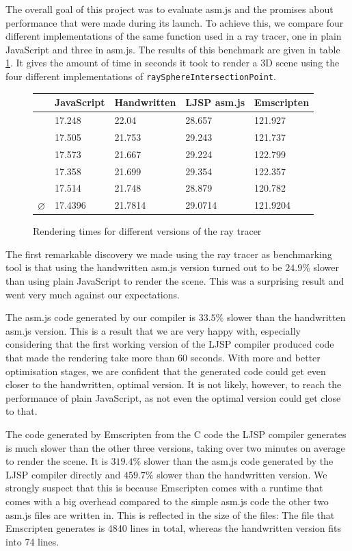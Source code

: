 \documentclass[11pt]{report}
\begin{document}
The overall goal of this project was to evaluate asm.js and the promises about performance that were made during its launch. To achieve this, we compare four different implementations of the same function used in a ray tracer, one in plain JavaScript and three in asm.js. The results of this benchmark are given in table \ref{benchmarks}. It gives the amount of time in seconds it took to render a 3D scene using the four different implementations of \texttt{raySphereIntersectionPoint}.

\begin{figure}[ht]
\begin{center}
  \begin{tabular}{ l | l | l | l | l }
    & JavaScript & Handwritten & LJSP asm.js & Emscripten \\ \hline
    & 17.248 & 22.04 & 28.657 & 121.927 \\
    & 17.505 & 21.753 & 29.243 & 121.737 \\
    & 17.573 & 21.667 & 29.224 & 122.799 \\
    & 17.358 & 21.699 & 29.354 & 122.357 \\
    & 17.514 & 21.748 & 28.879 & 120.782 \\ \hline
    $\varnothing$ & 17.4396 & 21.7814 & 29.0714 & 121.9204 \\
  \end{tabular}
\end{center}
\caption{Rendering times for different versions of the ray tracer}
\label{benchmarks}
\end{figure}

The first remarkable discovery we made using the ray tracer as benchmarking tool is that using the handwritten asm.js version turned out to be $24.9\%$ slower than using plain JavaScript to render the scene. This was a surprising result and went very much against our expectations.

The asm.js code generated by our compiler is $33.5\%$ slower than the handwritten asm.js version. This is a result that we are very happy with, especially considering that the first working version of the LJSP compiler produced code that made the rendering take more than 60 seconds. With more and better optimisation stages, we are confident that the generated code could get even closer to the handwritten, optimal version. It is not likely, however, to reach the performance of plain JavaScript, as not even the optimal version could get close to that.

The code generated by Emscripten from the C code the LJSP compiler generates is much slower than the other three versions, taking over two minutes on average to render the scene. It is $319.4\%$ slower than the asm.js code generated by the LJSP compiler directly and $459.7\%$ slower than the handwritten version. We strongly suspect that this is because Emscripten comes with a runtime that comes with a big overhead compared to the simple asm.js code the other two asm.js files are written in. This is reflected in the size of the files: The file that Emscripten generates is 4840 lines in total, whereas the handwritten version fits into 74 lines.
\end{document}
